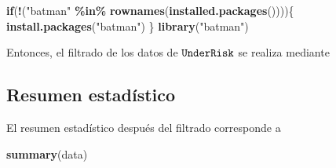 \documentclass[
  spanish,
]{article}
\newenvironment{Shaded}{\begin{snugshade}}{\end{snugshade}}
\newcommand{\ControlFlowTok}[1]{\textcolor[rgb]{0.13,0.29,0.53}{\textbf{#1}}}
\newcommand{\KeywordTok}[1]{\textcolor[rgb]{0.13,0.29,0.53}{\textbf{#1}}}
\newcommand{\NormalTok}[1]{#1}
\newcommand{\OperatorTok}[1]{\textcolor[rgb]{0.81,0.36,0.00}{\textbf{#1}}}
\newcommand{\StringTok}[1]{\textcolor[rgb]{0.31,0.60,0.02}{#1}}
\begin{document}
\begin{Shaded}
\begin{Highlighting}[]
\ControlFlowTok{if}\NormalTok{(}\OperatorTok{!}\NormalTok{(}\StringTok{"batman"} \OperatorTok{\%in\%}\StringTok{ }\KeywordTok{rownames}\NormalTok{(}\KeywordTok{installed.packages}\NormalTok{())))\{}
    \KeywordTok{install.packages}\NormalTok{(}\StringTok{"batman"}\NormalTok{)}
\NormalTok{\}}
\KeywordTok{library}\NormalTok{(}\StringTok{"batman"}\NormalTok{)}
\end{Highlighting}
\end{Shaded}

Entonces, el filtrado de los datos de \(\verb|UnderRisk|\) se realiza
mediante

\begin{Shaded}
\end{Shaded}

\newpage

\hypertarget{resumen-estaduxedstico}{%
\subsection{Resumen estadístico}\label{resumen-estaduxedstico}}

El resumen estadístico después del filtrado corresponde a

\begin{Shaded}
\begin{Highlighting}[]
\KeywordTok{summary}\NormalTok{(data)}
\end{Highlighting}
\end{Shaded}
\end{document}
